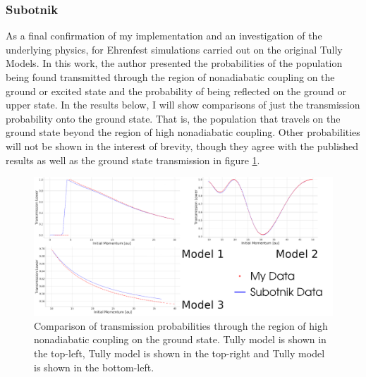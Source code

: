 \subsubsection{Subotnik}
As a final confirmation of my implementation and an investigation of the underlying physics,  \cite{SubotnikMomentumEhrenfest} for Ehrenfest simulations carried out on the  original Tully Models. In this work, the author presented the probabilities of the population being found transmitted through the region of nonadiabatic coupling on the ground or excited state and the probability of being reflected on the ground or upper state. In the results below, I will show comparisons of just the transmission probability onto the ground state. That is, the population that travels on the ground state beyond the region of high nonadiabatic coupling. Other probabilities will not be shown in the interest of brevity, though they agree with the published results as well as the ground state transmission in figure \ref{fig:SubotnikComparison}.
\begin{figure}[ht]
  \includegraphics[width=\textwidth]{../img/CTMQC/TullyModels/Ehrenfest_vs_Subotnik.png}
  \caption{\label{fig:SubotnikComparison}Comparison of transmission probabilities through the region of high nonadiabatic coupling on the ground state. Tully model  is shown in the top-left, Tully model  is shown in the top-right and Tully model  is shown in the bottom-left.}
\end{figure}
